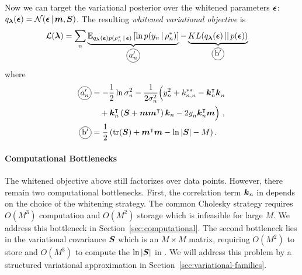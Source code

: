 \iffalse
\begin{align}
  \bepsilon \sim \mathcal{N}(0, I) \,, \quad
  \bu = \bK_{\bu,\bu}^{1/2} \bepsilon \sim \mathcal{N}(0, \bK^{}_{\bu,\bu}) \,.
   \label{eq:matrix-sqrt}
\end{align}
\fi
Now we can target the variational posterior over
the whitened parameters
$\boldsymbol{\epsilon}$: 
${q_{{\boldsymbol{\lambda}}}(\boldsymbol{\epsilon}) = \mathcal{N}(\boldsymbol{\epsilon} \,|\, \boldsymbol{m}, \boldsymbol{S})}$.
The resulting \emph{whitened variational objective} is
\begin{align}
\label{eq:whitened-elbo}
\mathcal{L}(\blambda)
  &= \sum_{n} \underbrace{
  	    \mathbb{E}_{q_{\blambda}(\bepsilon) p(\rho_n^* \given \bepsilon)} \left[
	    	\ln p(y_n \given \rho_n^*)
	    \right]
	  }_{\circled{$a'_n$}} -
      \underbrace{
	  	KL(q_{\blambda}(\bepsilon) \,||\, p(\bepsilon))
	  }_{\circled{b$'$}} \,
\end{align}
where
\begin{align}
\circled{$a'_n$}
&= -\frac{1}{2}\ln \sigma_n^2 - \frac{1}{2\sigma_n^2}
    \Big( y_n^2 + k^{**}_{n,n} - \bk_n^\intercal \bk^{}_n  \nonumber \\
&\quad + \bk_n^\intercal
     \left( \bS + \bm \bm^\intercal \right) \bk_n - 2 y^{}_n \bk_n^\intercal \bm
    \Big) \,\,,\\
\circled{b$'$}
  &= \frac{1}{2}\left( \text{tr}(\bS) + \bm^\intercal \bm - \ln |\bS| - M \right) .
\label{eq:kl-term}
\end{align}
\iffalse
 and we define the correlation term for clarity
 \begin{align}
    \bk_n \triangleq Cov(\bepsilon, \be_n)  = \bK_{\bu,\bu}^{-1/2}\bK^*_{\bu,n}  \,\,.
    \label{eq:k-vector}
 \end{align}
 \fi
\paragraph{Computational Bottlenecks}
The whitened objective above still factorizes over data points. However, there remain two computational bottlenecks. First, the correlation term $\boldsymbol{k}_n$ in 
depends on the choice of the whitening strategy.
The common Cholesky strategy requires $O(M^3)$ computation and $O(M^2)$ storage
which is infeasible for large $M$.
We address this bottleneck in Section~\ref{sec:computational}.
The second bottleneck lies in the variational covariance $\boldsymbol{S}$ which is an $M \times M$ matrix,
requiring $O(M^2)$ to store and $O(M^3)$ to compute the $\ln |\boldsymbol{S}|$ in .
We will address this problem by a structured
variational approximation in Section~\ref{sec:variational-families}.
